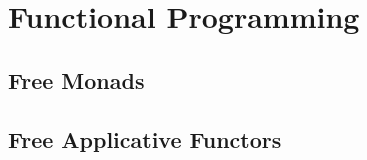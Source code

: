 \section{Functional Programming}
\label{sec:funct-progr}

\subsection{Free Monads}
\label{sec:free-monads}

\cite{Haxl}

\subsection{Free Applicative Functors}
\label{sec:free-appl-funct}

\cite{FreeApplicatives}

